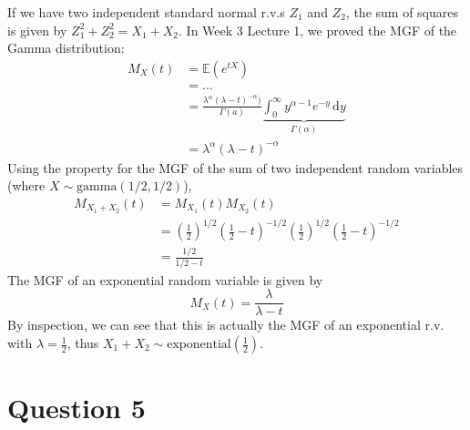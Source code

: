 \documentclass[12pt]{article}
\begin{document}
If we have two independent standard normal r.v.s $Z_{1}$ and $Z_{2}$, the sum of squares is given by $Z_{1}^{2}+ Z_{2}^{2} = X_{1} + X_{2}$. In Week 3 Lecture 1, we proved the MGF of the Gamma distribution: \begin{align*}
    M_X (t) &= \mathbb{E}(e^{tX}) \\ 
    &= \dots \\ 
    &= \frac{\lambda^{\alpha}(\lambda - t)^{-\alpha})}{\Gamma (a)} \underbrace{\int_{0}^{\infty} y^{\alpha-1}e^{-y} \, \mathrm{d}y}_{\Gamma (\alpha)} \\ 
    &= \lambda^{\alpha}(\lambda - t)^{-\alpha}
\end{align*} Using the property for the MGF of the sum of two independent random variables (where $X \sim \text{gamma}(1 / 2 , 1 / 2)$), \begin{align*}
    M_{X_{1} + X_{2}}(t) &= M_{X_{1}}  (t) M_{X_{2}} (t) \\ 
    &= \left( \frac{1}{2} \right)^{1 / 2} \left( \frac{1}{2} - t \right)^{- 1 / 2} \left( \frac{1}{2} \right)^{1 / 2} \left( \frac{1}{2} - t \right)^{- 1 / 2} \\ 
    &= \frac{1 / 2}{1 / 2 - t}
\end{align*} The MGF of an exponential random variable is given by \begin{equation*}
    M_X (t) = \frac{\lambda}{\lambda - t}
\end{equation*} By inspection, we can see that this is actually the MGF of an exponential r.v. with $\lambda = \frac{1}{2}$, thus $X_{1} + X_{2} \sim \text{exponential}(\frac{1}{2})$.    

\newpage

\section*{Question 5}
\end{document}
